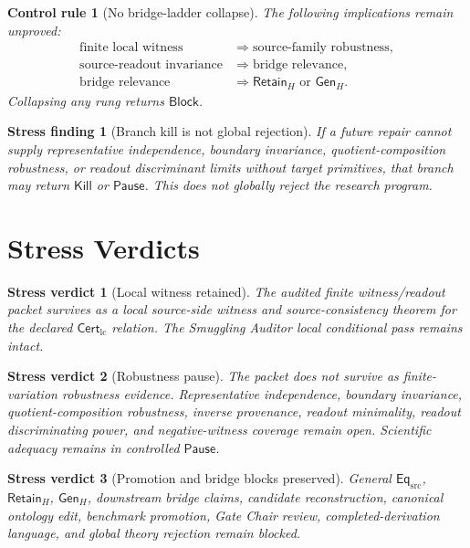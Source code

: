 \documentclass[11pt]{article}
\newcommand{\EqSrc}{\mathsf{Eq}_{\mathrm{src}}}
\newcommand{\CertLC}{\mathsf{Cert}_{\mathrm{lc}}}
\newcommand{\RetainH}{\mathsf{Retain}_{H}}
\newcommand{\GenH}{\mathsf{Gen}_{H}}
\newcommand{\Block}{\mathsf{Block}}
\newcommand{\Pause}{\mathsf{Pause}}
\newcommand{\Kill}{\mathsf{Kill}}
\newtheorem{stressfinding}{Stress finding}
\newtheorem{controlrule}{Control rule}
\newtheorem{verdict}{Stress verdict}
\begin{document}
\begin{controlrule}[No bridge-ladder collapse]
The following implications remain unproved:
\[
\begin{aligned}
    \text{finite local witness} &\Longrightarrow
    \text{source-family robustness},\\
    \text{source-readout invariance} &\Longrightarrow
    \text{bridge relevance},\\
    \text{bridge relevance} &\Longrightarrow
    \RetainH\text{ or }\GenH .
\end{aligned}
\]
Collapsing any rung returns \(\Block\).
\end{controlrule}

\begin{stressfinding}[Branch kill is not global rejection]
If a future repair cannot supply representative independence, boundary
invariance, quotient-composition robustness, or readout discriminant
limits without target primitives, that branch may return \(\Kill\) or
\(\Pause\). This does not globally reject the research program.
\end{stressfinding}

\section{Stress Verdicts}

\begin{verdict}[Local witness retained]
The audited finite witness/readout packet survives as a local
source-side witness and source-consistency theorem for the declared
\(\CertLC\) relation. The Smuggling Auditor local conditional pass
remains intact.
\end{verdict}

\begin{verdict}[Robustness pause]
The packet does not survive as finite-variation robustness evidence.
Representative independence, boundary invariance, quotient-composition
robustness, inverse provenance, readout minimality, readout
discriminating power, and negative-witness coverage remain open.
Scientific adequacy remains in controlled \(\Pause\).
\end{verdict}

\begin{verdict}[Promotion and bridge blocks preserved]
General \(\EqSrc\), \(\RetainH\), \(\GenH\), downstream bridge claims,
candidate reconstruction, canonical ontology edit, benchmark
promotion, Gate Chair review, completed-derivation language, and global
theory rejection remain blocked.
\end{verdict}
\end{document}
